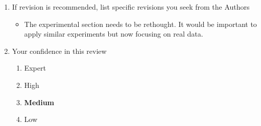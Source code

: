 \documentclass{article}
\begin{document}
\begin{enumerate}
 \item If revision is recommended, list specific revisions you seek from the Authors
 \begin{framed}
  \begin{itemize}
    \item The experimental section needs to be rethought. It would be important to apply similar experiments but now focusing on real data. 
  \end{itemize}
 \end{framed}
 
 \item Your confidence in this review
 \begin{enumerate}[I]
  \item Expert
  \item High
  \item \textbf{Medium}
  \item Low
 \end{enumerate}
 
\end{enumerate}
\end{document}
